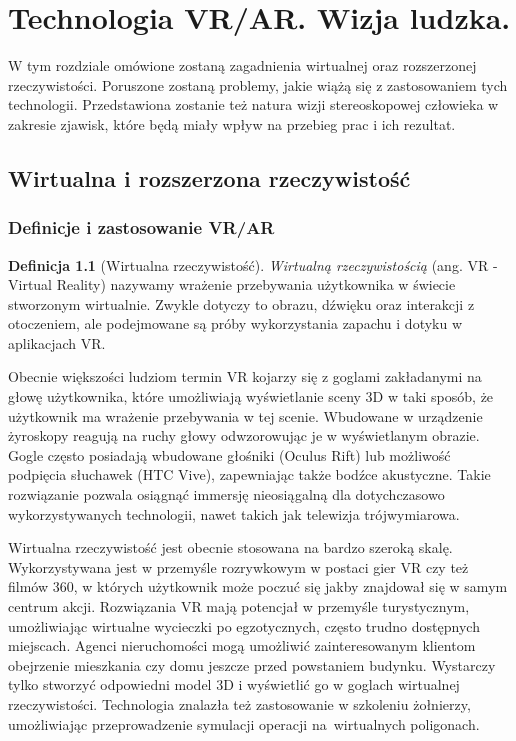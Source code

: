 \documentclass[a4paper,11pt,twoside]{report}
\theoremstyle{definition}
\newtheorem{definition}[theorem]{Definicja}
\begin{document}
\chapter{Technologia VR/AR. Wizja ludzka.}

W tym rozdziale omówione zostaną zagadnienia wirtualnej oraz rozszerzonej rzeczywistości. Poruszone zostaną problemy, jakie wiążą się z zastosowaniem tych technologii. Przedstawiona zostanie też natura wizji stereoskopowej człowieka w zakresie zjawisk, które będą miały wpływ na przebieg prac i ich rezultat.

\section{Wirtualna i rozszerzona rzeczywistość}

\subsection{Definicje i zastosowanie VR/AR}

\begin{definition}[Wirtualna rzeczywistość]
\textit{Wirtualną rzeczywistością} (ang. VR - Virtual Reality) nazywamy wrażenie przebywania użytkownika w świecie stworzonym wirtualnie. Zwykle dotyczy to obrazu, dźwięku oraz interakcji z otoczeniem, ale podejmowane są próby wykorzystania zapachu i dotyku w aplikacjach VR.
\end{definition}

Obecnie większości ludziom termin VR kojarzy się z goglami zakładanymi na głowę użytkownika, które umożliwiają wyświetlanie sceny 3D w taki sposób, że użytkownik ma wrażenie przebywania w tej scenie. Wbudowane w urządzenie żyroskopy reagują na ruchy głowy odwzorowując je w wyświetlanym obrazie. Gogle często posiadają wbudowane głośniki (Oculus Rift) lub możliwość podpięcia słuchawek (HTC Vive), zapewniając także bodźce akustyczne. Takie rozwiązanie pozwala osiągnąć immersję nieosiągalną dla dotychczasowo wykorzystywanych technologii, nawet takich jak telewizja trójwymiarowa.

Wirtualna rzeczywistość jest obecnie stosowana na bardzo szeroką skalę. Wykorzystywana jest w przemyśle rozrywkowym w postaci gier VR czy też filmów 360\textdegree, w których użytkownik może poczuć się jakby znajdował się w samym centrum akcji. Rozwiązania VR mają potencjał w przemyśle turystycznym, umożliwiając wirtualne wycieczki po egzotycznych, często trudno dostępnych miejscach. Agenci nieruchomości mogą umożliwić zainteresowanym klientom obejrzenie mieszkania czy domu jeszcze przed powstaniem budynku. Wystarczy tylko stworzyć odpowiedni model 3D i wyświetlić go w goglach wirtualnej rzeczywistości. Technologia znalazła też zastosowanie w szkoleniu żołnierzy, umożliwiając przeprowadzenie symulacji operacji na~wirtualnych poligonach.\cite{VRdefinition}
\end{document}
